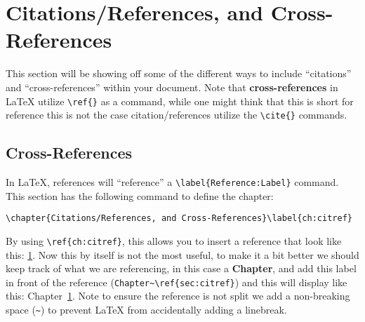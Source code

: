 \chapter{Citations/References, and Cross-References}\label{ch:citref}
	This section will be showing off some of the different ways to include \enquote{citations} and \enquote{cross-references} within your document.
	Note that \textbf{cross-references} in \LaTeX{} utilize \lstinline|\ref{}| as a command, while one might think that this is short for reference this is not the case citation/references utilize the \lstinline|\cite{}| commands.
	\section{Cross-References}
		In \LaTeX{}, references will \enquote{reference} a \lstinline|\label{Reference:Label}| command. 
		This section has the following command to define the chapter:
		\begin{Center}
			\lstinline|\chapter{Citations/References, and Cross-References}\label{ch:citref}|
		\end{Center}
		By using \lstinline|\ref{ch:citref}|, this allows you to insert a reference that look like this: \ref{ch:citref}.
		Now this by itself is not the most useful, to make it a bit better we should keep track of what we are referencing, in this case a \textbf{Chapter}, and add this label in front of the reference (\lstinline|Chapter~\ref{sec:citref}|) and this will display like this: Chapter~\ref{ch:citref}.
		Note to ensure the reference is not split we add a non-breaking space (\lstinline|~|) to prevent \LaTeX{} from accidentally adding a linebreak.

